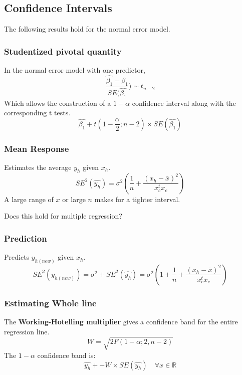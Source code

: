 \documentclass[12pt]{article}
\begin{document}
\subsection{Confidence Intervals}
The following results hold for the normal error model.

\subsubsection{Studentized pivotal quantity}
In the normal error model with one predictor, 
\[
    \frac{\hat{\beta_1} - \beta_1}{SE(\hat{\beta_1}}) \sim t_{n - 2}
\]
Which allows the construction of a $1 - \alpha$ confidence interval along
with the corresponding t tests.
\[
    \hat{\beta_1} + t(1 - \frac{\alpha}{2}; n - 2) \times
    SE(\hat{\beta_1})
\]

\subsubsection{Mean Response}
Estimates the average $y_h$ given $x_h$. 
\[
    SE^2(\hat{y_h}) = \sigma^2 (\frac{1}{n} + \frac{(x_h - \bar{x})^2}{x_c^t
x_c})
\]
A large range of $x$ or large $n$ makes for a tighter interval.

Does this hold for multiple regression?

\subsubsection{Prediction}
Predicts $y_{h(new)}$ given $x_h$. 
\[
    SE^2(y_{h(new)}) = \sigma^2 + SE^2(\hat{y_h})
    = \sigma^2 ( 1 + \frac{1}{n} + \frac{(x_h - \bar{x})^2}{x_c^t x_c})
\]

\subsubsection{Estimating Whole line}
The \textbf{Working-Hotelling multiplier} gives a confidence band for the
entire regression line.
\[
    W = \sqrt{2F(1 - \alpha;2, n-2)}
\]
The $1 - \alpha$ confidence band is:
\[
    \hat{y_h} +- W \times SE(\hat{y_h}) \quad \forall x \in \mathbb{R}
\]
\end{document}
